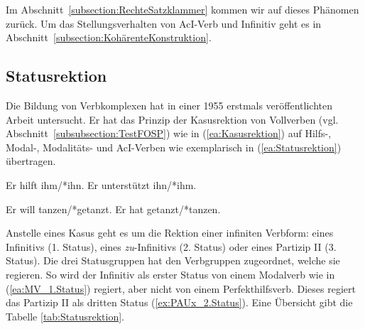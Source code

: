 Im Abschnitt~\ref{subsection:RechteSatzklammer} kommen wir auf dieses Phänomen zurück. Um das Stellungsverhalten von AcI-Verb und Infinitiv geht es in Abschnitt~\ref{subsection:KohärenteKonstruktion}.


\subsection{Statusrektion}\label{subsection:Statusrektion}

Die Bildung von Verbkomplexen hat \citet{Bech1983} in einer 1955 erstmals veröffentlichten Arbeit untersucht. Er hat das Prinzip der Kasusrektion von Vollverben (vgl. Abschnitt~\ref{subsubsection:TestFOSP}) wie in (\ref{ea:Kasusrektion}) auf Hilfs-, Modal-, Modalitäts- und AcI-Verben wie exemplarisch in (\ref{ea:Statusrektion}) übertragen. 

\ea \label{ea:Kasusrektion}
\ea \label{ea:hilftDativ} Er hilft ihm/*ihn.
\ex \label{ex:unterstütztAkkusativ} Er unterstützt ihn/*ihm.
\z 
\z 

\ea \label{ea:Statusrektion}
\ea \label{ea:MV_1.Status} Er will tanzen/*getanzt.
\ex \label{ex:PAUx_2.Status} Er hat getanzt/*tanzen.
\z 
\z 

Anstelle eines Kasus geht es um die Rektion einer infiniten Verbform: eines Infinitivs (1. Status), eines \textit{zu}-Infinitivs (2. Status) oder eines Partizip II (3. Status). Die drei Statusgruppen hat \citet[12]{Bech1983} den Verbgruppen zugeordnet, welche sie regieren. So wird der Infinitiv als erster Status \zB von einem Modalverb wie in (\ref{ea:MV_1.Status}) regiert, aber nicht von einem Perfekthilfsverb. Dieses regiert das Partizip II als dritten Status (\ref{ex:PAUx_2.Status}). Eine Übersicht gibt die Tabelle \ref{tab:Statusrektion}.

\begin{table}[!htbp]
  \centering
  \caption{Statusrektion nach \citet[12]{Bech1983}}
  \label{tab:Statusrektion}
\end{table}

